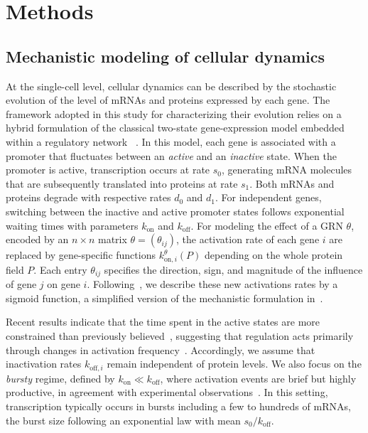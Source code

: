 \section{Methods}
\label{methods_section}

\subsection{Mechanistic modeling of cellular dynamics}
\label{sec:mechanistic_model}

At the single-cell level, cellular dynamics can be described by the stochastic evolution of the level of mRNAs and proteins expressed by each gene. The framework adopted in this study for characterizing their evolution relies on a hybrid formulation of the classical two-state gene-expression model embedded within a regulatory network ~\cite{herbachinferring2017}. In this model, each gene is associated with a promoter that fluctuates between an \emph{active} and an \emph{inactive} state. When the promoter is active, transcription occurs at rate $s_0$, generating mRNA molecules that are subsequently translated into proteins at rate $s_1$. Both mRNAs and proteins degrade with respective rates $d_0$ and $d_1$. For independent genes, switching between the inactive and active promoter states follows exponential waiting times with parameters $k_{\mathrm{on}}$ and $k_{\mathrm{off}}$. For modeling the effect of a GRN $\theta$, encoded by an $n \times n$ matrix $\theta = (\theta_{ij})$, the activation rate of each gene $i$ are replaced by gene-specific functions $k^\theta_{\mathrm{on},i}(P)$ depending on the whole protein field $P$. Each entry $\theta_{ij}$ specifies the direction, sign, and magnitude of the influence of gene $j$ on gene $i$. Following~\cite{herbach2018modelisation, ventre2023one}, we describe these new activations rates by a sigmoid function, a simplified version of the mechanistic formulation in~\cite{herbachinferring2017,bonnaffoux2019wasabi}.

Recent results indicate that the time spent in the active states are more constrained than previously believed~\cite{RN6412}, suggesting that regulation acts primarily through changes in activation frequency~\cite{li2011central}. Accordingly, we assume that inactivation rates $k_{\mathrm{off}, i}$ remain independent of protein levels. We also focus on the \emph{bursty} regime, defined by $k_{\mathrm{on}} \ll k_{\mathrm{off}}$, where activation events are brief but highly productive, in agreement with experimental observations~\cite{suter2011mammalian}. In this setting, transcription typically occurs in bursts including a few to hundreds of mRNAs, the burst size following an exponential law with mean $s_0/k_{\mathrm{off}}$. 

